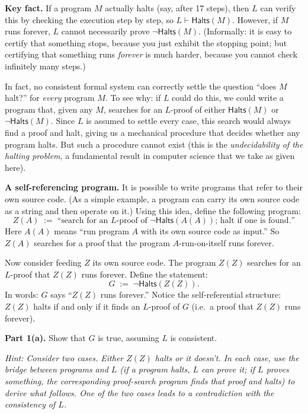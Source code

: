 \documentclass[11pt]{article}
\begin{document}
\begin{exercise}
\label{ex:godel}
\noindent
\textbf{Key fact.} If a program $M$ actually halts (say, after 17 steps), then $L$ can
verify this by checking the execution step by step, so $L \vdash \mathsf{Halts}(M)$.
However, if $M$ runs forever, $L$ cannot necessarily prove
$\neg\mathsf{Halts}(M)$. (Informally: it is easy to certify that something stops, because
you just exhibit the stopping point; but certifying that something runs \emph{forever}
is much harder, because you cannot check infinitely many steps.)

\medskip
\noindent
In fact, no consistent formal system can correctly settle the question ``does $M$ halt?''
for \emph{every} program $M$. To see why: if $L$ could do this, we could write a program
that, given any $M$, searches for an $L$-proof of either $\mathsf{Halts}(M)$ or
$\neg\mathsf{Halts}(M)$. Since $L$ is assumed to settle every case, this search would
always find a proof and halt, giving us a mechanical procedure that decides whether
any program halts. But such a procedure cannot exist (this is the \emph{undecidability
of the halting problem}, a fundamental result in computer science that we take as
given here).

\medskip
\noindent
\textbf{A self-referencing program.} It is possible to write programs that refer to
their own source code. (As a simple example, a program can carry its own source code
as a string and then operate on it.) Using this idea, define the following program:
\[
  Z(A) \;:=\; \text{``search for an $L$-proof of
  $\neg\mathsf{Halts}(A(A))$; halt if one is found.''}
\]
Here $A(A)$ means ``run program $A$ with its own source code as input.'' So $Z(A)$
searches for a proof that the program $A$-run-on-itself runs forever.

\medskip
\noindent
Now consider feeding $Z$ its own source code. The program $Z(Z)$ searches for an
$L$-proof that $Z(Z)$ runs forever. Define the statement:
\[
  G \;:=\; \neg\mathsf{Halts}(Z(Z)).
\]
In words: $G$ says ``$Z(Z)$ runs forever.'' Notice the self-referential
structure: $Z(Z)$ halts if and only if it finds an $L$-proof of $G$ (i.e.\ a proof that
$Z(Z)$ runs forever).

\medskip
\noindent
\textbf{Part 1(a).} Show that $G$ is true, assuming $L$ is consistent.

\medskip
\noindent
\emph{Hint: Consider two cases. Either $Z(Z)$ halts or it doesn't. In each case, use
the bridge between programs and $L$ (if a program halts, $L$ can prove it; if $L$
proves something, the corresponding proof-search program finds that proof and halts)
to derive what follows. One of the two cases leads to a contradiction with the
consistency of $L$.}


\end{exercise}
\end{document}
